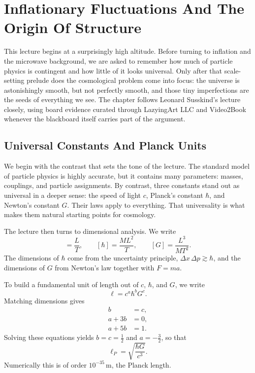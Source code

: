 \chapter{Inflationary Fluctuations And The Origin Of Structure}

This lecture begins at a surprisingly high altitude. Before turning to inflation and the microwave background, we are asked to remember how much of particle physics is contingent and how little of it looks universal. Only after that scale-setting prelude does the cosmological problem come into focus: the universe is astonishingly smooth, but not perfectly smooth, and those tiny imperfections are the seeds of everything we see. The chapter follows Leonard Susskind's lecture closely, using board evidence curated through LazyingArt LLC and Video2Book whenever the blackboard itself carries part of the argument.

\section{Universal Constants And Planck Units}

We begin with the contrast that sets the tone of the lecture. The standard model of particle physics is highly accurate, but it contains many parameters: masses, couplings, and particle assignments. By contrast, three constants stand out as universal in a deeper sense: the speed of light \(c\), Planck's constant \(\hbar\), and Newton's constant \(G\). Their laws apply to everything. That universality is what makes them natural starting points for cosmology.

The lecture then turns to dimensional analysis. We write
\begin{equation}
[c]=\frac{L}{T}, \qquad [\hbar]=\frac{ML^{2}}{T}, \qquad [G]=\frac{L^{3}}{MT^{2}}.
\end{equation}
The dimensions of \(\hbar\) come from the uncertainty principle, \(\Delta x\,\Delta p \gtrsim \hbar\), and the dimensions of \(G\) from Newton's law together with \(F=ma\).

To build a fundamental unit of length out of \(c\), \(\hbar\), and \(G\), we write
\begin{equation}
\ell = c^{a}\hbar^{b}G^{c}.
\end{equation}
Matching dimensions gives
\begin{align}
b&=c,\\
a+3b&=0,\\
a+5b&=1.
\end{align}
Solving these equations yields \(b=c=\tfrac12\) and \(a=-\tfrac32\), so that
\begin{equation}
\ell_{P}=\sqrt{\frac{\hbar G}{c^{3}}}.
\end{equation}
Numerically this is of order \(10^{-35}\,\mathrm{m}\), the Planck length.

